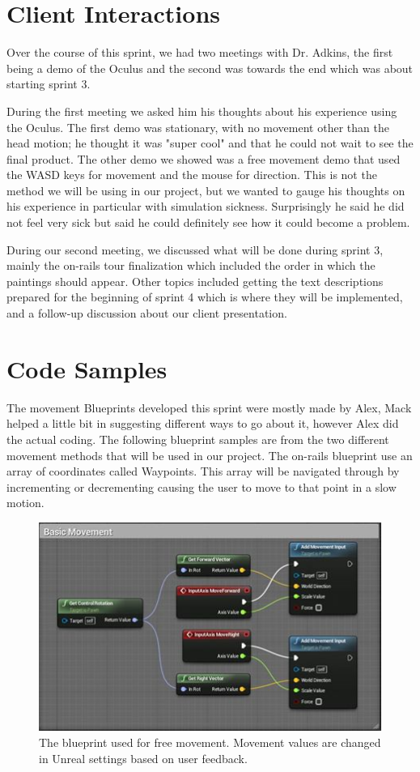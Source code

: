 \documentclass[11pt]{book}
\begin{document}
\section*{Client Interactions}
Over the course of this sprint, we had two meetings with Dr. Adkins, the first being a demo of the Oculus and the second was towards the end which was about starting sprint 3.  

During the first meeting we asked him his thoughts about his experience using the Oculus. The first demo was stationary, with no movement other than the head motion; he thought it was "super cool" and that he could not wait to see the final product.  The other demo we showed was a free movement demo that used the WASD keys for movement and the mouse for direction.  This is not the method we will be using in our project, but we wanted to gauge his thoughts on his experience in particular with simulation sickness.  Surprisingly he said he did not feel very sick but said he could definitely see how it could become a problem.

During our second meeting, we discussed what will be done during sprint 3, mainly the on-rails tour finalization which included the order in which the paintings should appear.  Other topics included getting the text descriptions prepared for the beginning of sprint 4 which is where they will be implemented, and a follow-up discussion about our client presentation.


\section*{Code Samples}
The movement Blueprints developed this sprint were mostly made by Alex, Mack helped a little bit in suggesting different ways to go about it, however Alex did the actual coding.  The following blueprint samples are from the two different movement methods that will be used in our project.  The on-rails blueprint use an array of coordinates called Waypoints.  This array will be navigated through by incrementing or decrementing causing the user to move to that point in a slow motion.

\begin{figure}
\caption{The blueprint used for free movement.  Movement values are changed in Unreal settings based on user feedback.}
\centering
\includegraphics[scale=1.0]{basicMovement.png}
\end{figure}
\end{document}
